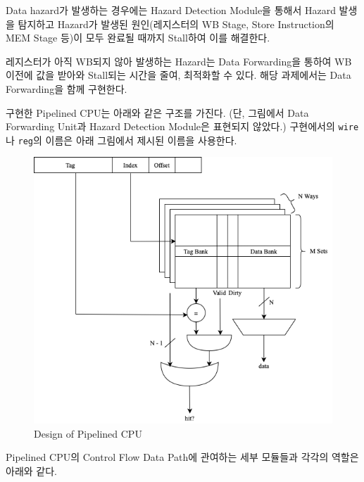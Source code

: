 \documentclass[openright, a4paper]{article}
\newcommand{\code}[1]{\texttt{#1}}
\begin{document}
\hfill

Data hazard가 발생하는 경우에는 Hazard Detection Module을 통해서 Hazard 발생을 탐지하고 Hazard가 발생된 원인(레지스터의 WB Stage, Store Instruction의 MEM Stage 등)이 모두 완료될 때까지 Stall하여 이를 해결한다.

\hfill

레지스터가 아직 WB되지 않아 발생하는 Hazard는 Data Forwarding을 통하여 WB 이전에 값을 받아와 Stall되는 시간을 줄여, 최적화할 수 있다. 해당 과제에서는 Data Forwarding을 함께 구현한다.

\hfill

구현한 Pipelined CPU는 아래와 같은 구조를 가진다. (단, 그림에서 Data Forwarding Unit과 Hazard Detection Module은 표현되지 않았다.) 구현에서의 \code{wire}나 \code{reg}의 이름은 아래 그림에서 제시된 이름을 사용한다.

\hfill

{
    \begin{figure}[!h]
        \centering
        \includegraphics[width=\textwidth]{img/schematic.png}
        \caption{Design of Pipelined CPU}
    \end{figure}
}

\hfill

Pipelined CPU의 Control Flow Data Path에 관여하는 세부 모듈들과 각각의 역할은 아래와 같다.

\hfill
\end{document}
